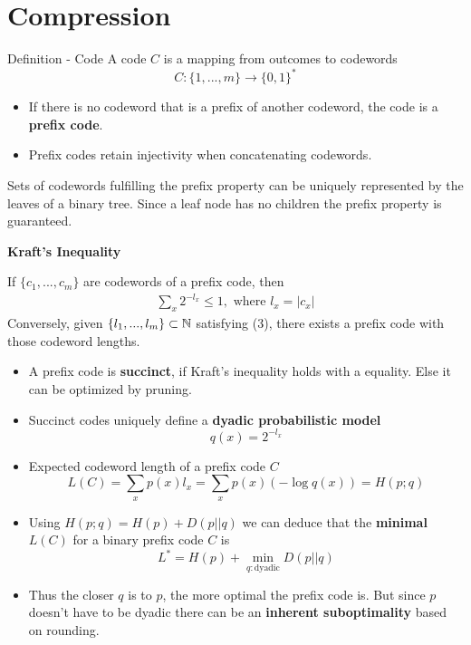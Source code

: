 \section{Compression}

\begin{mainbox}
    {Definition - Code} 
    A code \(C\) is a mapping from outcomes to codewords
    \[C: \{1, ..., m\} \to \{0, 1\}^*\]
    \begin{itemize}[label=-]
        \item If there is no codeword that is a prefix of another codeword, the code is a \textbf{prefix code}. 
        \item Prefix codes retain injectivity when concatenating codewords.
    \end{itemize}
\end{mainbox}
Sets of codewords fulfilling the prefix property can be uniquely represented by the leaves of a binary tree. 
Since a leaf node has no children the prefix property is guaranteed.

\vspace*{1mm}
\textbf{Kraft's Inequality}

    If \(\{c_1, ...,c_m\}\) are codewords of a prefix code, then 
\begin{align}
    \sum_{x}2^{-l_x} \leq 1, \text{ where }l_x = |c_x|
\end{align}
Conversely, given \(\{l_1, ..., l_m\} \subset \mathbb{N}\) satisfying (3), there exists a prefix code with those codeword lengths.
\begin{itemize}[label=-]
    \item A prefix code is \textbf{succinct}, if Kraft's inequality holds with a equality. Else it can be optimized by pruning.
    \item Succinct codes uniquely define a \textbf{dyadic probabilistic model}
    \[q(x) = 2^{- l_x}\]
    \item Expected codeword length of a prefix code \(C\) 
    \[L(C) = \sum_{x}p(x) l_x = \sum_{x}p(x) (-\log q(x)) = H(p; q)\]
    \item Using \(H(p; q) = H(p) + D(p || q)\) we can deduce that the \textbf{minimal \(L(C)\)} for a binary prefix code \(C\) is
    \[L^* = H(p) + \min_{q: \text{dyadic}} D(p || q)\]
    \item Thus the closer \(q\) is to \(p\), the more optimal the prefix code is. 
    But since \(p\) doesn't have to be dyadic there can be an \textbf{inherent suboptimality} based on rounding.
\end{itemize}

